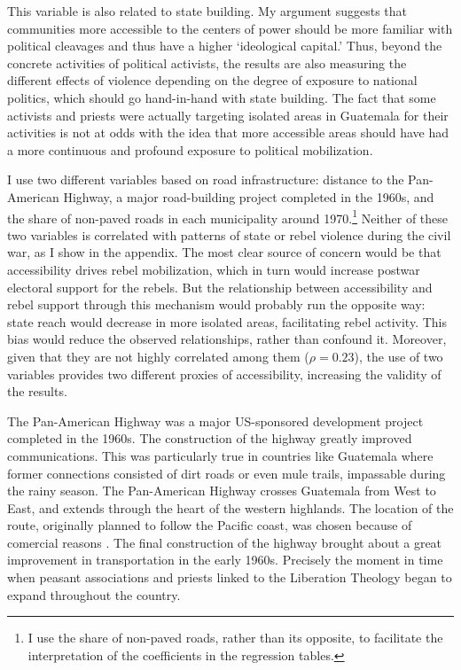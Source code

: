 \documentclass[12pt, notitlepage]{article}
\begin{document}
This variable is also related to state building.
My argument suggests that communities more accessible to the centers of power should be more familiar with political cleavages and thus have a higher `ideological capital.'
Thus, beyond the concrete activities of political activists, the results are also measuring the different effects of violence depending on the degree of exposure to national politics, which should go hand-in-hand with state building.
The fact that some activists and priests were actually targeting isolated areas in Guatemala for their activities is not at odds with the idea that more accessible areas should have had a more continuous and profound exposure to political mobilization.

I use two different variables based on road infrastructure: distance to the Pan-American Highway, a major road-building project completed in the 1960s, and the share of non-paved roads in each municipality around 1970.\footnote{I use the share of non-paved roads, rather than its opposite, to facilitate the interpretation of the coefficients in the regression tables.}
Neither of these two variables is correlated with patterns of state or rebel violence during the civil war, as I show in the appendix.
The most clear source of concern would be that accessibility drives rebel mobilization, which in turn would increase postwar electoral support for the rebels.
But the relationship between accessibility and rebel support through this mechanism would probably run the opposite way: state reach would decrease in more isolated areas, facilitating rebel activity.
This bias would reduce the observed relationships, rather than confound it.
Moreover, given that they are not highly correlated among them ($\rho = 0.23$), the use of two variables provides two different proxies of accessibility, increasing the validity of the results.

The Pan-American Highway was a major US-sponsored development project completed in the 1960s.
The construction of the highway greatly improved communications.
This was particularly true in countries like Guatemala where former connections consisted of dirt roads or even mule trails, impassable during the rainy season.
The Pan-American Highway crosses Guatemala from West to East, and extends through the heart of the western highlands.
The location of the route, originally planned to follow the Pacific coast, was chosen because of comercial reasons \citep{Rutkow:2019aa}.
The final construction of the highway brought about a great improvement in transportation in the early 1960s.
Precisely the moment in time when peasant associations and priests linked to the Liberation Theology began to expand throughout the country.
\end{document}
